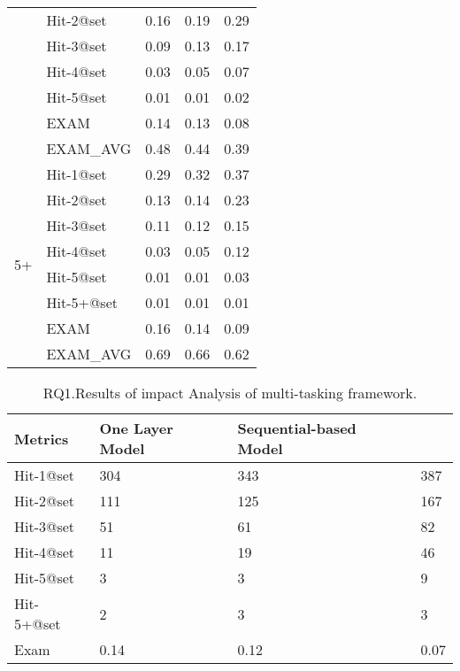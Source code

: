 \begin{table}[b]
{\begin{center}
\begin{tabular}{p{0.5cm}<{\centering}|p{1.5cm}<{\centering}|p{1.5cm}<{\centering}|p{1.5cm}<{\centering}|p{1.2cm}<{\centering}}
									& Hit-2@set     & 0.16 & 0.19 & 0.29 \\
									& Hit-3@set     & 0.09 & 0.13 & 0.17 \\
									& Hit-4@set     & 0.03 & 0.05 & 0.07 \\
									& Hit-5@set     & 0.01 & 0.01 & 0.02 \\
									& EXAM          & 0.14 & 0.13 & 0.08 \\
									& EXAM\_AVG     & 0.48 & 0.44 & 0.39 \\
				\hline
				\multirow{8}{*}{5+}  & Hit-1@set     & 0.29 & 0.32 & 0.37 \\
									& Hit-2@set     & 0.13 & 0.14 & 0.23 \\
									& Hit-3@set     & 0.11 & 0.12 & 0.15 \\
									& Hit-4@set     & 0.03 & 0.05 & 0.12 \\
									& Hit-5@set     & 0.01 & 0.01 & 0.03 \\
									& Hit-5+@set    & 0.01 & 0.01 & 0.01 \\
									& EXAM          & 0.16 & 0.14 & 0.09 \\
									& EXAM\_AVG     & 0.69 & 0.66 & 0.62 \\
				\hline
			\end{tabular}
			
			\label{fig:rq2}
		\end{center}
	}
\end{table}
\fi

\begin{table}[h]
	\caption{RQ1.Results of impact Analysis of multi-tasking framework.}
	{\small
		\begin{center}
			\renewcommand{\arraystretch}{1}
			\begin{tabular}{p{1.5cm}<{\centering}|p{2cm}<{\centering}|p{2cm}<{\centering}|p{1.2cm}<{\centering}}
				\hline
				Metrics & One Layer Model & Sequential-based Model &  \tool \\			
				\hline
				Hit-1@set   & 304 & 343 & 387 \\
				Hit-2@set	& 111 & 125 & 167\\
				Hit-3@set	& 51 & 61 & 82\\
				Hit-4@set	& 11 & 19 & 46\\
				Hit-5@set	& 3 & 3 & 9\\
				Hit-5+@set	& 2 & 3 & 3\\
				Exam     	& 0.14 & 0.12 & 0.07\\
				\hline
			\end{tabular}
			
			\label{fig:rq2-1}
		\end{center}
	}
\end{table}

